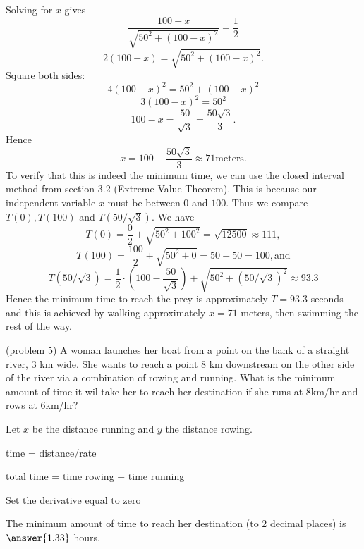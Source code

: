 \documentclass[handout]{ximera}
\begin{document}
\begin{example}[example 5]
Solving for $x$ gives
\[
\frac{100 - x}{\sqrt{50^2 + (100-x)^2}} = \frac12
\]
\[
2(100 - x) = \sqrt{50^2 + (100-x)^2}.
\]
Square both sides:
\[
4(100-x)^2 = 50^2 + (100-x)^2
\]
\[
3(100-x)^2 = 50^2
\]
\[
100-x = \frac{50}{\sqrt{3}} = \frac{50\sqrt{3}}{3}.
\]
Hence
\[
x = 100 - \frac{50\sqrt{3}}{3} \approx 71 \text{meters}.
\]
To verify that this is indeed the minimum time, we can use the closed interval method from section 3.2 (Extreme Value Theorem).
This is because our independent variable $x$ must be between $0$ and $100$. Thus we compare $T(0), T(100)$ and $T(50/\sqrt 3)$.
We have 
\[
T(0) = \frac02 +  \sqrt{50^2 + 100^2} = \sqrt{12500} \approx 111,
\]
\[
T(100) = \frac{100}{2} +  \sqrt{50^2 + 0} = 50 + 50 = 100, \text{and}
\]
\[
T(50/\sqrt 3) = \frac12 \cdot \left(100- \frac{50}{\sqrt 3}\right) +  \sqrt{50^2 + (50/\sqrt 3)^2} \approx 93.3
\]
Hence the minimum time to reach the prey is approximately $T=93.3$ seconds and this is achieved by walking approximately $x =71$ meters, 
then swimming the rest of the way.
\end{example}


\begin{problem}(problem 5)
A woman launches her boat from a point on the bank of a straight river, 3 km wide. 
She wants to reach a point 8 km downstream on the other side of the river via a combination of rowing and running.
What is the minimum amount of time it wil take her to reach her destination if she runs at 8km/hr and rows at 6km/hr?


\begin{hint}
Let $x$ be the distance running and $y$ the distance rowing.
\end{hint}
\begin{hint}
time = distance/rate
\end{hint}
\begin{hint}
total time = time rowing + time running
\end{hint}
\begin{hint}
Set the derivative equal to zero
\end{hint}

The minimum amount of time to reach her destination (to 2 decimal places) is $\answer{1.33}$ hours.
\end{problem}
\end{document}
